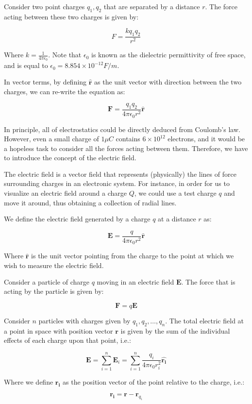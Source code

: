 \documentclass{article}
\begin{document}
\begin{theorem}
    Consider two point charges $q_1, q_2$ that are separated by a distance $r$. The force acting between these two charges is given by:

    \[ F = \frac{kq_1q_2}{r^2} \]

    Where $k = \frac{1}{4\pi\epsilon_0}$. Note that $\epsilon_0$ is known as the dielectric permittivity of free space, and is equal to $\epsilon_0 = 8.854 \times 10^{-12}F/m$.

    In vector terms, by defining $\mathbf{\hat{r}}$ as the unit vector with direction between the two charges, we can re-write the equation as:

    \[ \mathbf{F} = \frac{q_1q_2}{4\pi\epsilon_0r^2}\mathbf{\hat{r}} \]
\end{theorem}

In principle, all of electrostatics could be directly deduced from Coulomb's law. However, even a small charge of $1 \mu C$ contains $6 \times 10^{12}$ electrons, and it would be a hopeless task to consider all the forces acting between them. Therefore, we have to introduce the concept of the electric field.

The electric field is a vector field that represents (physically) the lines of force surrounding charges in an electronic system. For instance, in order for us to visualize an electric field around a charge $Q$, we could use a test charge $q$ and move it around, thus obtaining a collection of radial lines.

\begin{definition}
    We define the electric field generated by a charge $q$ at a distance $r$ as:

    \[ \mathbf{E} = \frac{q}{4\pi\epsilon_0r^2}\mathbf{\hat{r}} \]

    Where $\mathbf{\hat{r}}$ is the unit vector pointing from the charge to the point at which we wish to measure the electric field.
\end{definition}

\begin{proposition}
    Consider a particle of charge $q$ moving in an electric field $\mathbf{E}$. The force that is acting by the particle is given by:

    \[ \mathbf{F} = q\mathbf{E} \]
\end{proposition}

\begin{theorem}[Superposition]
    Consider $n$ particles with charges given by $q_1, q_2, \dots, q_n$. The total electric field at a point in space with position vector $\mathbf{r}$ is given by the sum of the individual effects of each charge upon that point, i.e.:

    \[ \mathbf{E} = \sum_{i = 1}^n \mathbf{E}_i = \sum_{i = 1}^n \frac{q_i}{4\pi\epsilon_0r_i^2}\mathbf{\hat{r_i}} \]

    Where we define $\mathbf{r_i}$ as the position vector of the point relative to the charge, i.e.:

    \[ \mathbf{r_i} = \mathbf{r} - \mathbf{r}_{q_i} \]
\end{theorem}
\end{document}
